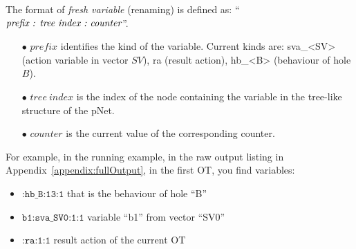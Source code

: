 \documentclass{lncs/llncs}
\newcommand{\TODO}[1]{\textcolor{red}{\textbf{[TODO:#1]}}}
\newcommand{\OTvar}{\texttt}
\begin{document}
\begin{definition}\label{fresh-variable}
The format of \emph{fresh variable} (renaming) is defined as:
``$\emph{prefix : tree\ index\ :\ counter}$''.
\begin{itemize}
   \item[$\bullet$] $prefix$ identifies the kind of the
     variable. Current kinds are: sva\_<SV> (action variable in vector
     $SV$), ra (result action), hb\_<B> (behaviour of hole $B$).
   \item[$\bullet$] $tree\ index$ is the index of the node containing
     the variable in the tree-like structure of the pNet. 
   \item[$\bullet$] $counter$ is the current value of the corresponding counter.
\end{itemize}
\end{definition}



For example, in the running example, in the raw output listing in
Appendix~\ref{appendix:fullOutput}, in the first OT, you find variables: 
\begin{itemize}
   \item $\OTvar{:hb\_B:13:1}$ that is the behaviour of hole ``B''
   \item $\OTvar{b1:sva\_SV0:1:1}$ variable ``b1'' from vector ``SV0''
   \item $\OTvar{:ra:1:1}$ result action of the current OT
\end{itemize}
\end{document}

